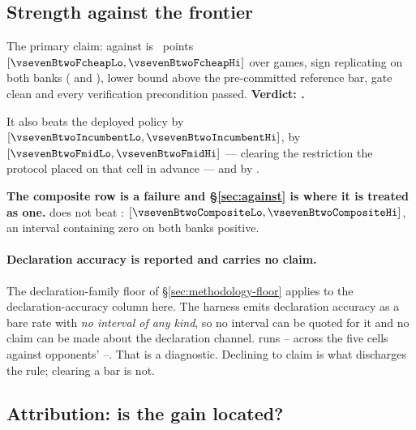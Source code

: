 \subsection{Strength against the frontier}
\label{sec:results-frontier}

\begin{table}[t]\centering
\caption{Headline strength against the \vsix{} frontier, paired duplicate, both primary banks. The
preregistered primary claim is the \fcheap{} row.}
\label{tab:frontier}
{\small}
\end{table}

The primary claim: \frozen{} against \fcheap{} is \textbf{\vsevenBtwoFcheap{}}~points
$[\vsevenBtwoFcheapLo, \vsevenBtwoFcheapHi]$ over \vsevenBtwoFcheapN{} games, sign replicating on both
banks (\vsevenBtwoFcheapBankOne{} and \vsevenBtwoFcheapBankTwo{}), lower bound above the
pre-committed \vsevenPrimaryFloor{} reference bar, gate clean and every verification precondition
passed. \textbf{Verdict: \vsevenPrimaryVerdict{}.}

It also beats the deployed policy by \vsevenBtwoIncumbent{}
$[\vsevenBtwoIncumbentLo, \vsevenBtwoIncumbentHi]$, \fmid{} by \vsevenBtwoFmid{}
$[\vsevenBtwoFmidLo, \vsevenBtwoFmidHi]$ --- clearing the restriction the protocol placed on that cell
in advance --- and \vfive{} by \vsevenBtwoVfive{}.

\textbf{The composite row is a failure and \S\ref{sec:against} is where it is treated as one.}
\frozen{} does not beat \composite{}: \vsevenBtwoComposite{}
$[\vsevenBtwoCompositeLo, \vsevenBtwoCompositeHi]$, an interval containing zero on both banks
positive.

\paragraph{Declaration accuracy is reported and carries no claim.}
The declaration-family floor of \S\ref{sec:methodology-floor} applies to the declaration-accuracy
column here. The harness emits declaration accuracy as a bare rate with \emph{no interval of any
kind}, so no interval can be quoted for it and no claim can be made about the declaration channel.
\frozen{} runs \vsevenDeclFrozenLo{}--\vsevenDeclFrozenHi{} across the five cells against opponents'
\vsevenDeclOppLo{}--\vsevenDeclOppHi{}. That is a diagnostic. Declining to claim is what discharges the
rule; clearing a bar is not.

\subsection{Attribution: is the gain located?}
\label{sec:results-attribution}

